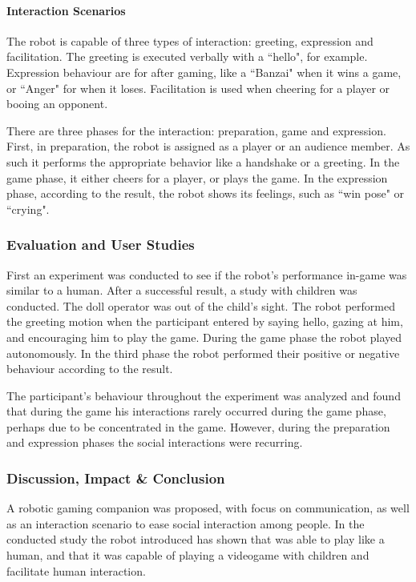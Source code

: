 \documentclass[runningheads]{llncs}
\begin{document}
\paragraph{Interaction Scenarios} The robot is capable of three types of interaction: greeting, expression and facilitation. The greeting is executed verbally with a ``hello", for example. Expression behaviour are for after gaming, like a ``Banzai" when it wins a game, or ``Anger" for when it loses. Facilitation is used when cheering for a player or booing an opponent.
\par There are three phases for the interaction: preparation, game and expression. First, in preparation, the robot is assigned as a player or an audience member. As such it performs the appropriate behavior like a handshake or a greeting. In the game phase, it either cheers for a player, or plays the game. In the expression phase, according to the result, the robot shows its feelings, such as ``win pose" or ``crying".


\subsubsection{Evaluation and User Studies}
\par First an experiment was conducted to see if the robot's performance in-game was similar to a human. After a successful result, a study with children was conducted. The doll operator was out of the child's sight. The robot performed the greeting motion when the participant entered by saying hello, gazing at him, and encouraging him to play the game. During the game phase the robot played autonomously. In the third phase the robot performed their positive or negative behaviour according to the result.
\par The participant's behaviour throughout the experiment was analyzed and found that during the game his interactions rarely occurred during the game phase, perhaps due to be concentrated in the game. However, during the preparation and expression phases the social interactions were recurring.

\subsubsection{Discussion, Impact \& Conclusion}
\par A robotic gaming companion was proposed, with focus on communication, as well as an interaction scenario to ease social interaction among people. In the conducted study the robot introduced has shown that was able to play like a human, and that it was capable of playing a videogame with children and facilitate human interaction.
\end{document}
